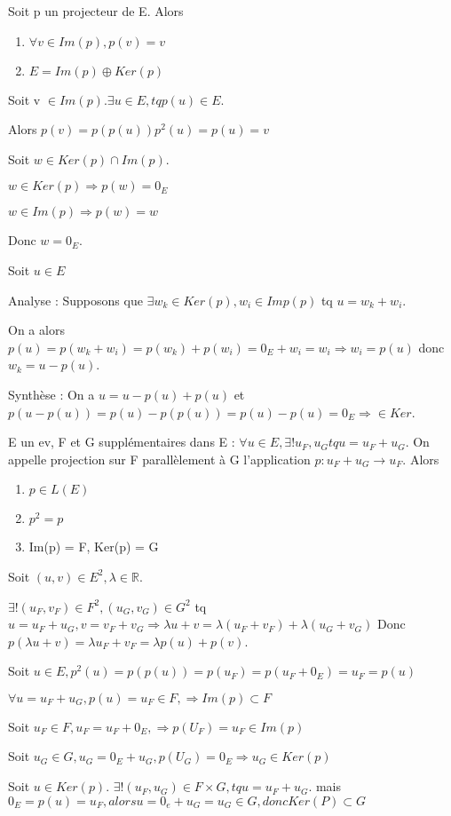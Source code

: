 \documentclass[french]{yLectureNote}
\newcommand{\R}[0]{\mathbb{R}}
\begin{document}
\begin{proposition}
Soit p un projecteur de E. Alors
\begin{enumerate}
 \item \(\forall v \in Im(p), p(v) = v\)
 \item \(E = Im(p)\oplus Ker(p)\)
\end{enumerate}
\end{proposition}
\begin{myproof}
 Soit v $\in Im(p). \exists u\in E, tq p(u)\in E.$

 Alors $p(v) = p(p(u)) p^2(u) = p(u) = v$


 Soit $w\in Ker(p)\cap Im(p)$.

 $w\in Ker(p) \Rightarrow p(w) = 0_E$

 $w\in Im(p)\Rightarrow p(w)  = w$

 Donc $w=0_E$.

 Soit $u\in E$

 Analyse : Supposons que $\exists w_k \in Ker(p), w_i\in Imp(p)$ tq $u = w_k+w_i$.

 On a alors $p(u) = p(w_k+w_i) = p(w_k)+p(w_i) = 0_E+w_i = w_i \Rightarrow w_i = p(u)$ donc $w_k = u-p(u)$.

 Synthèse : On a $u = u-p(u) + p(u)$ et $p(u - p(u)) = p(u) - p(p(u)) = p(u) - p(u) = 0_E\Rightarrow \in Ker$.
\end{myproof}
\begin{definition}[Projection]
E un ev, F et G supplémentaires dans E : \(\forall u \in E, \exists! u_F,u_G tq u = u_F+u_G\). On appelle projection sur F parallèlement à G l'application \(p: u_F+u_G \to u_F\). Alors
\begin{enumerate}
 \item \(p\in L(E)\)
 \item \(p^2=p\)
 \item Im(p) = F, Ker(p) = G
\end{enumerate}
\end{definition}
\begin{myproof}
Soit $(u,v)\in E^2, \lambda \in \R$.

$\exists ! (u_F,v_F)\in F^2, (u_G, v_G)\in G^2$ tq $u = u_F+u_G, v = v_F+v_G \Rightarrow \lambda u + v = \lambda(u_F+v_F)+\lambda(u_G+v_G)$ Donc $p(\lambda u + v) = \lambda u_F+v_F = \lambda p(u)+p(v)$.


Soit $u\in E, p^2(u) = p(p(u)) = p(u_F) = p(u_F+0_E) = u_F = p(u)$


$\forall u = u_F+u_G, p(u) = u_F\in F,\Rightarrow Im(p)\subset F$

Soit $u_F\in F, u_F = u_F+0_E, \Rightarrow p(U_F) = u_F \in Im(p)$

Soit $u_G\in G, u_G = 0_E + u_G, p(U_G) = 0_E \Rightarrow u_G \in Ker(p)$

Soit $u\in Ker(p)$. $\exists! (u_F, u_G)\in F\times G, tq u = u_F+u_G$. mais $0_E = p(u) = u_F, alors u = 0_e + u_G = u_G \in G, donc Ker(P)\subset G$
\end{myproof}
\end{document}
